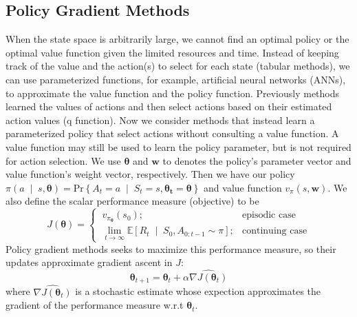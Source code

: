 \documentclass[11pt]{article}
\begin{document}
\subsection{Policy Gradient Methods}
When the state space is arbitrarily large, we cannot find an optimal policy or
the optimal value function given the limited resources and time. Instead of 
keeping track of the value and the action(s) to select for each state (tabular 
methods), we can use parameterized functions, for example, artificial neural 
networks (ANNs), to approximate the value function and the policy function. 
\vspace{3mm}\newline Previously methods learned the values of actions and then 
select actions based on their estimated action values (q function). Now we 
consider methods that instead learn a parameterized policy that select actions 
without consulting a value function. A value function may still be used to 
learn the policy parameter, but is not required for action selection.
\vspace{3mm}\newline We use \(\bm{\theta}\) and \(\bm{w}\) to denotes the 
policy's parameter vector and value function's weight vector, respectively.
Then we have our policy \(\pi\left(a\;\middle|\;s, \bm{\theta}\right)=
\text{Pr}\left\{A_t=a\;\middle|\;S_t=s, \bm{\theta_t}=\bm{\theta}\right\}\) and
value function \(v_\pi(s, \bm{w})\). We also define the scalar performance 
measure (objective) to be 
\[J(\bm{\theta})=\begin{cases}
    \ v_{\pi_{\bm{\theta}}}(s_0); &\text{episodic case}\\
    \ \lim_{t \to \infty} \mathbb{E}
    \left[R_t\;\middle|\;S_0,A_{0:t-1}\sim\pi\right];      
                                  & \text{continuing case}
\end{cases}\]
Policy gradient methods seeks to maximize this performance measure, so their 
updates approximate gradient ascent in \(J\):
\[\bm{\theta}_{t+1}=\bm{\theta}_t+\alpha\widehat{\nabla J(\bm{\theta}_t)}\]
where \(\widehat{\nabla J(\bm{\theta}_t)}\) is a stochastic estimate whose
expection approximates the gradient of the performance measure w.r.t 
\(\bm{\theta}_t\).
\end{document}
